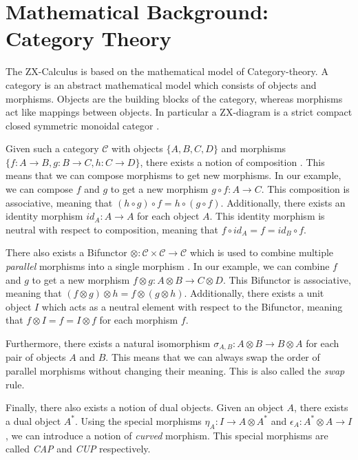 
\section{Mathematical Background: Category Theory}

The ZX-Calculus is based on the mathematical model of Category-theory. A category is an abstract mathematical model which consists of objects and morphisms. Objects are the building blocks of the category, whereas morphisms act like mappings
between objects. In particular a ZX-diagram is a strict compact
closed symmetric monoidal categor \cite{emmanueljeandel2020zx}.

Given such a category $\mathcal{C}$ with objects $\{A,B,C,D\}$ and morphisms $\{f: A \rightarrow B, g: B \rightarrow C, h: C \rightarrow D\}$, there exists a notion of composition \label{sequential-composition}. This means that we can compose morphisms to get new morphisms. In our example, we can compose $f$ and $g$ to get a new morphism $g \circ f: A \rightarrow C$. This composition is associative, meaning that $(h \circ g) \circ f = h \circ (g \circ f)$. Additionally, there exists an identity morphism $id_A: A \rightarrow A$ for each object $A$. This identity morphism is neutral with respect to composition, meaning that $f \circ id_A = f = id_B \circ f$.

There also exists a Bifunctor $\otimes:\mathcal{C}\times\mathcal{C}\rightarrow\mathcal{C}$ which is used to combine multiple \textit{parallel} morphisms into a single morphism \label{parallel-composition}. In our example, we can combine $f$ and $g$ to get a new morphism $f \otimes g: A \otimes B \rightarrow C \otimes D$. This Bifunctor is associative, meaning that $(f \otimes g) \otimes h = f \otimes (g \otimes h)$. Additionally, there exists a unit object $I$ which acts as a neutral element with respect to the Bifunctor, meaning that $f \otimes I = f = I \otimes f$ for each morphism $f$.

Furthermore, there exists a natural isomorphism $\sigma_{A,B}: A \otimes B \rightarrow B \otimes A$ for each pair of objects $A$ and $B$. This means that we can always swap the order of parallel morphisms without changing their meaning. This is also called the \textit{swap} rule.


Finally, there also exists a notion of dual objects. Given an object $A$, there exists a dual object $A^*$. Using the special morphisms $\eta_A: I \rightarrow A \otimes A^*$ and $\epsilon_A: A^* \otimes A \rightarrow I$, we can introduce a notion of \textit{curved} morphism. This special morphisms are called \textit{CAP} and \textit{CUP} respectively.

